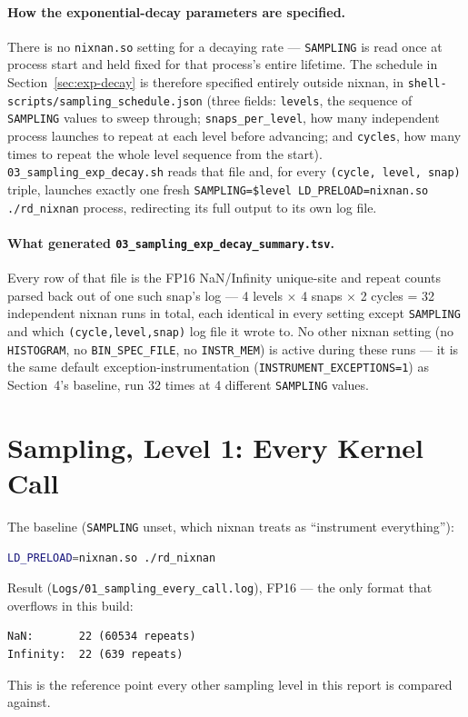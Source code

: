 \documentclass[11pt]{article}
\begin{document}
\paragraph{How the exponential-decay parameters are specified.} There is no
\texttt{nixnan.so} setting for a decaying rate --- \texttt{SAMPLING} is read once at
process start and held fixed for that process's entire lifetime. The schedule in
Section~\ref{sec:exp-decay} is therefore specified entirely outside nixnan, in
\texttt{shell-scripts/sampling\_schedule.json} (three fields: \texttt{levels}, the
sequence of \texttt{SAMPLING} values to sweep through; \texttt{snaps\_per\_level}, how
many independent process launches to repeat at each level before advancing; and
\texttt{cycles}, how many times to repeat the whole level sequence from the start).
\texttt{03\_sampling\_exp\_decay.sh} reads that file and, for every
\texttt{(cycle, level, snap)} triple, launches exactly one fresh
\texttt{SAMPLING=\$level LD\_PRELOAD=nixnan.so ./rd\_nixnan} process, redirecting its
full output to its own log file.

\paragraph{What generated \texttt{03\_sampling\_exp\_decay\_summary.tsv}.} Every row of
that file is the FP16 NaN/Infinity unique-site and repeat counts parsed back out of one
such snap's log --- 4 levels $\times$ 4 snaps $\times$ 2 cycles = 32 independent nixnan
runs in total, each identical in every setting except \texttt{SAMPLING} and which
\texttt{(cycle,level,snap)} log file it wrote to. No other nixnan setting (no
\texttt{HISTOGRAM}, no \texttt{BIN\_SPEC\_FILE}, no \texttt{INSTR\_MEM}) is active
during these runs --- it is the same default exception-instrumentation
(\texttt{INSTRUMENT\_EXCEPTIONS=1}) as Section~4's baseline, run 32 times at 4 different
\texttt{SAMPLING} values.

\section{Sampling, Level 1: Every Kernel Call}
\label{sec:sample-every}

The baseline (\texttt{SAMPLING} unset, which nixnan treats as ``instrument
everything''):
\begin{lstlisting}[language=bash]
LD_PRELOAD=nixnan.so ./rd_nixnan
\end{lstlisting}
Result (\texttt{Logs/01\_sampling\_every\_call.log}), FP16 --- the only format that
overflows in this build:
\begin{lstlisting}
NaN:       22 (60534 repeats)
Infinity:  22 (639 repeats)
\end{lstlisting}
This is the reference point every other sampling level in this report is compared
against.
\end{document}
